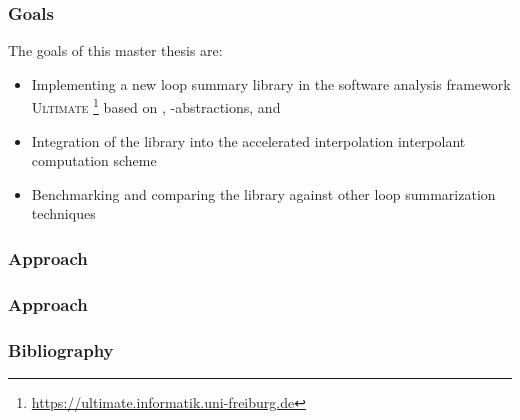 \documentclass[%
10pt,
dvipsnames,
]{beamer}
\begin{document}
\begin{frame}[t]
	\frametitle{Goals}
	The goals of this master thesis are:
	\begin{itemize}
		\item Implementing a new loop summary library in the software analysis framework \textsc{Ultimate} \footnote{\url{https://ultimate.informatik.uni-freiburg.de}} based on \qvasr, \qvasr-abstractions, and \qvasrs
		\item Integration of the library into the accelerated interpolation interpolant computation scheme
		\item Benchmarking and comparing the library against other loop summarization techniques
	\end{itemize}
\end{frame}

\begin{frame}[t]
	\frametitle{Approach}
	\resizebox{11cm}{!}{}
\end{frame}


\begin{frame}[t]
	\frametitle{Approach}
	\resizebox{11cm}{!}{}
\end{frame}

\begin{frame}
	\label{slide:bibliography}
	\frametitle{Bibliography}
	\fontsize{10}{10}\selectfont
	
	\nocite{DBLP:conf/cav/SilvermanK19} \nocite{DBLP:conf/cav/SilvermanK19}
	
\end{frame}
\end{document}
